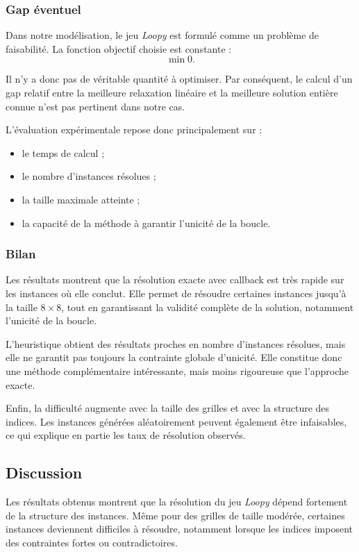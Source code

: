 \subsubsection{Gap éventuel}

Dans notre modélisation, le jeu \textit{Loopy} est formulé comme un problème de faisabilité. La fonction objectif choisie est constante :
\[
\min 0.
\]

Il n'y a donc pas de véritable quantité à optimiser. Par conséquent, le calcul d'un gap relatif entre la meilleure relaxation linéaire et la meilleure solution entière connue n'est pas pertinent dans notre cas.

L'évaluation expérimentale repose donc principalement sur :
\begin{itemize}
    \item le temps de calcul ;
    \item le nombre d'instances résolues ;
    \item la taille maximale atteinte ;
    \item la capacité de la méthode à garantir l'unicité de la boucle.
\end{itemize}

\subsubsection{Bilan}

Les résultats montrent que la résolution exacte avec callback est très rapide sur les instances où elle conclut. Elle permet de résoudre certaines instances jusqu'à la taille \(8 \times 8\), tout en garantissant la validité complète de la solution, notamment l'unicité de la boucle.

L'heuristique obtient des résultats proches en nombre d'instances résolues, mais elle ne garantit pas toujours la contrainte globale d'unicité. Elle constitue donc une méthode complémentaire intéressante, mais moins rigoureuse que l'approche exacte.

Enfin, la difficulté augmente avec la taille des grilles et avec la structure des indices. Les instances générées aléatoirement peuvent également être infaisables, ce qui explique en partie les taux de résolution observés.

\subsection{Discussion}

Les résultats obtenus montrent que la résolution du jeu \textit{Loopy} dépend fortement de la structure des instances. Même pour des grilles de taille modérée, certaines instances deviennent difficiles à résoudre, notamment lorsque les indices imposent des contraintes fortes ou contradictoires.

